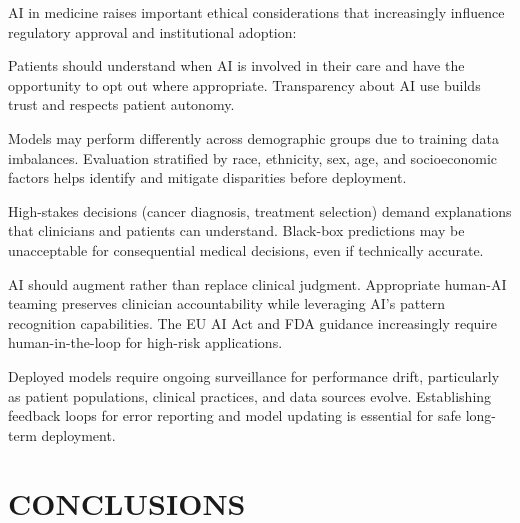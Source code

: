 \documentclass[krantz2,ChapterTOCs]{krantz}
\begin{document}
AI in medicine raises important ethical considerations that increasingly influence regulatory approval and institutional adoption:

\begin{description}[style=nextline, leftmargin=1em, labelindent=0pt, itemsep=0.2ex]
\item[Informed consent] Patients should understand when AI is involved in their care and have the opportunity to opt out where appropriate. Transparency about AI use builds trust and respects patient autonomy.

\item[Algorithmic fairness] Models may perform differently across demographic groups due to training data imbalances. Evaluation stratified by race, ethnicity, sex, age, and socioeconomic factors helps identify and mitigate disparities before deployment.

\item[Explainability requirements] High-stakes decisions (cancer diagnosis, treatment selection) demand explanations that clinicians and patients can understand. Black-box predictions may be unacceptable for consequential medical decisions, even if technically accurate.

\item[Human oversight] AI should augment rather than replace clinical judgment. Appropriate human-AI teaming preserves clinician accountability while leveraging AI's pattern recognition capabilities. The EU AI Act and FDA guidance increasingly require human-in-the-loop for high-risk applications.

\item[Continuous monitoring] Deployed models require ongoing surveillance for performance drift, particularly as patient populations, clinical practices, and data sources evolve. Establishing feedback loops for error reporting and model updating is essential for safe long-term deployment.
\end{description}

\section{CONCLUSIONS}
\label{sec:conclusions}
\end{document}
